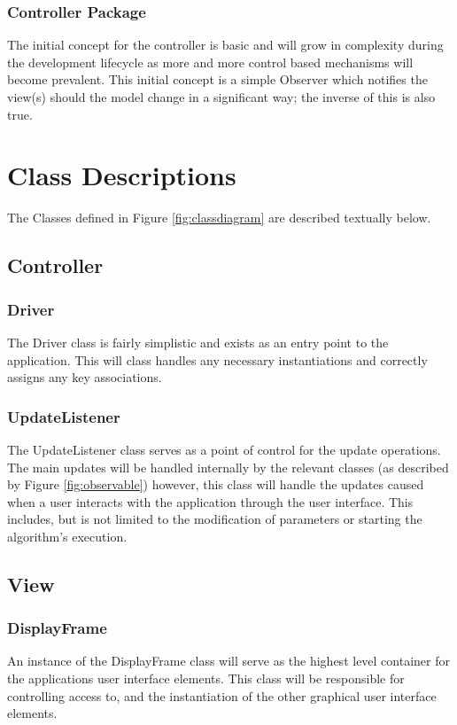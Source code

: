 \subsubsection{Controller Package}
\label{sssec:cntrl}
The initial concept for the controller is basic and will grow in complexity during the development lifecycle as more and more control based mechanisms will become prevalent. This initial concept is a simple Observer which notifies the view(s) should the model change in a significant way; the inverse of this is also true.

\section{Class Descriptions}

The Classes defined in Figure \ref{fig:classdiagram} are described textually below.

\subsection{Controller}

\subsubsection{Driver}
\label{driver:classdef}
The Driver class is fairly simplistic and exists as an entry point to the application. This will class handles any necessary instantiations and correctly assigns any key associations.
\subsubsection{UpdateListener}
The UpdateListener class serves as a point of control for the update operations. The main updates will be handled internally by the relevant classes (as described by Figure \ref{fig:observable}) however, this class will handle the updates caused when a user interacts with the application through the user interface. This includes, but is not limited to the modification of parameters or starting the algorithm's execution.

\subsection{View}
\subsubsection{DisplayFrame}
An instance of the DisplayFrame class will serve as the highest level container for the applications user interface elements. This class will be responsible for controlling access to, and the instantiation of the other graphical user interface elements.
